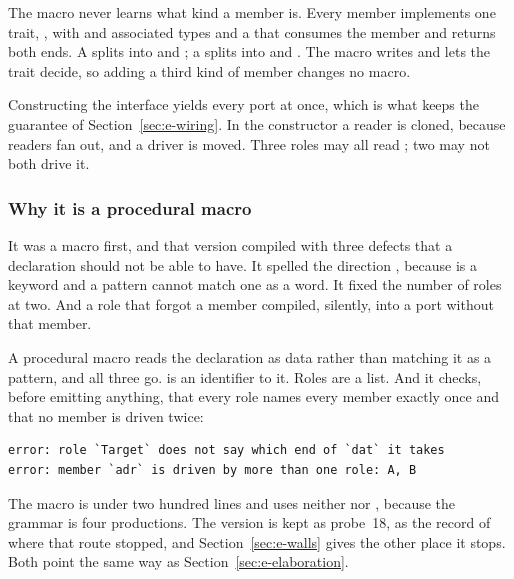 The macro never learns what kind a member is. Every member implements one
trait, , with  and  associated
types and a  that consumes the member and returns both ends.
A  splits into  and ; a  splits
into  and . The macro writes
 and lets the trait decide, so adding a third
kind of member changes no macro.

Constructing the interface yields every port at once, which is what keeps
the guarantee of Section~\ref{sec:e-wiring}. In the constructor a reader
is cloned, because readers fan out, and a driver is moved. Three roles
may all read ; two may not both drive it.

\subsubsection{Why it is a procedural macro}

It was a  macro first, and that version compiled
with three defects that a declaration should not be able to have. It
spelled the direction , because  is a keyword and a
pattern cannot match one as a word. It fixed the number of roles at two.
And a role that forgot a member compiled, silently, into a port without
that member.

A procedural macro reads the declaration as data rather than matching it
as a pattern, and all three go.  is an identifier to it. Roles
are a list. And it checks, before emitting anything, that every role
names every member exactly once and that no member is driven twice:

\begin{lstlisting}[style=ascii,caption={What the declaration cannot be. Both are the macro's own messages; the second would otherwise arrive as a move error naming a temporary.},label={lst:iface-errors}]
error: role `Target` does not say which end of `dat` it takes
error: member `adr` is driven by more than one role: A, B
\end{lstlisting}

The macro is under two hundred lines and uses neither  nor
, because the grammar is four productions. The
 version is kept as probe~18, as the record of where
that route stopped, and Section~\ref{sec:e-walls} gives the other place
it stops. Both point the same way as Section~\ref{sec:e-elaboration}.

